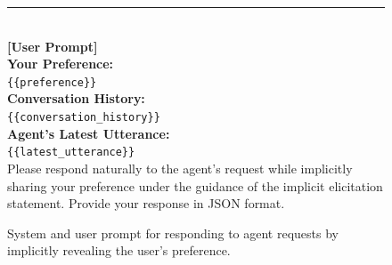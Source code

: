 \begin{figure}[t]
{\begin{tcolorbox}[colback=blue!5!white, colframe=blue!75!black, 
title=System and User Prompt for Preference-Based Responses, boxrule=0.3mm, width=\textwidth, arc=3mm, auto outer arc=true]
\rule{\linewidth}{0.2pt} \\

\textbf{[User Prompt]}\\[3mm]
\textbf{Your Preference:}\\
\texttt{\{\{preference\}\}}\\[1mm]

\textbf{Conversation History:}\\
\texttt{\{\{conversation\_history\}\}}\\[1mm]

\textbf{Agent's Latest Utterance:}\\
\texttt{\{\{latest\_utterance\}\}}\\[1mm]

Please respond naturally to the agent's request while implicitly sharing your preference under the guidance of the implicit elicitation statement. Provide your response in JSON format.

\end{tcolorbox}
}
\caption{System and user prompt for responding to agent requests by implicitly revealing the user's preference.}
\label{fig:response_preference_prompt}
\end{figure}


